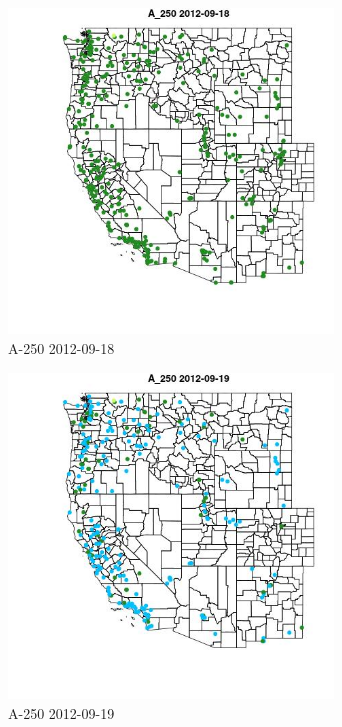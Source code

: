 \begin{figure} 
\centering  
\includegraphics[width=0.77\textwidth]{Code_Outputs/ML_input_report_ML_input_PM25_Step5_part_d_de_duplicated_aves_ML_input_MapObsA_2502012-09-18.jpg} 
\caption{\label{fig:ML_input_report_ML_input_PM25_Step5_part_d_de_duplicated_aves_ML_inputMapObsA_2502012-09-18}A-250 2012-09-18} 
\end{figure} 
 

\begin{figure} 
\centering  
\includegraphics[width=0.77\textwidth]{Code_Outputs/ML_input_report_ML_input_PM25_Step5_part_d_de_duplicated_aves_ML_input_MapObsA_2502012-09-19.jpg} 
\caption{\label{fig:ML_input_report_ML_input_PM25_Step5_part_d_de_duplicated_aves_ML_inputMapObsA_2502012-09-19}A-250 2012-09-19} 
\end{figure} 
 

